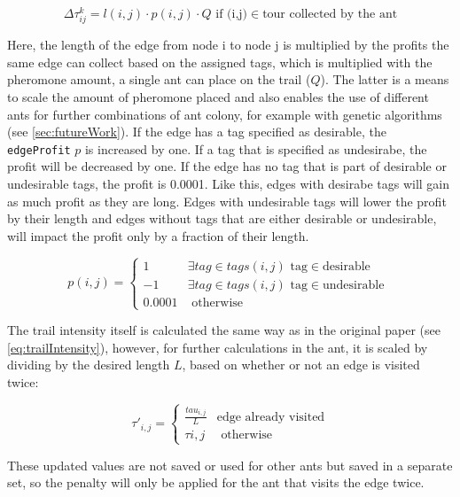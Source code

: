 \begin{equation}
	\label{eq:newPheromoneCalc}
	\Delta\tau_{ij}^k = l(i,j) \cdot p(i,j) \cdot Q \text{ if (i,j)} \in \text{tour collected by the ant}
\end{equation}

Here, the length of the edge from node i to node j is multiplied by the profits the same edge can collect based on the assigned tags, which is multiplied with the pheromone amount, a single ant can place on the trail ($Q$).
The latter is a means to scale the amount of pheromone placed and also enables the use of different ants for further combinations of ant colony, for example with genetic algorithms (see \ref{sec:futureWork}).
If the edge has a tag specified as desirable, the \texttt{edgeProfit} $p$ is increased by one.
If a tag that is specified as undesirabe, the profit will be decreased by one.
If the edge has no tag that is part of desirable or undesirable tags, the profit is 0.0001.
Like this, edges with desirabe tags will gain as much profit as they are long. 
Edges with undesirable tags will lower the profit by their length and edges without tags that are either desirable or undesirable, will impact the profit only by a fraction of their length.

\begin{equation}
	\label{eq:newProfitCalc}
	p(i,j) = \begin{cases}
		1 &\exists tag \in tags(i,j) \text{ tag} \in \text{desirable }\\
		-1 &\exists tag \in tags(i,j) \text{ tag} \in \text{undesirable }\\
		0.0001 &\text{ otherwise}
	\end{cases}
\end{equation}

The trail intensity itself is calculated the same way as in the original paper (see \ref{eq:trailIntensity}), however, for further calculations in the ant, it is scaled by dividing by the desired length $L$, based on whether or not an edge is visited twice:

\begin{equation}
	\label{eq:scaledTrailIntensity}
	\tau'_{i,j} = \begin{cases}
		 \frac{tau_{i,j}}{L} &\text{edge already visited}\\
		\tau{i,j} &\text{ otherwise}
	\end{cases}
\end{equation}

These updated values are not saved or used for other ants but saved in a separate set, so the penalty will only be applied for the ant that visits the edge twice.

